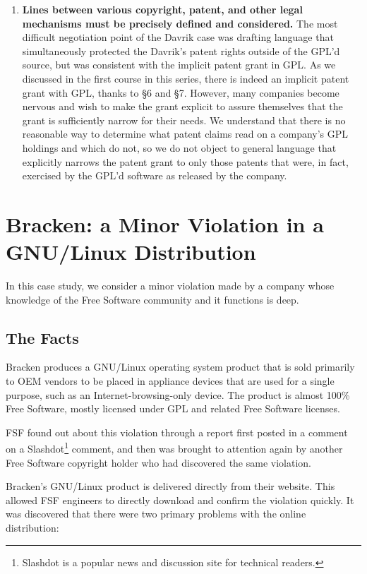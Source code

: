 \documentclass[12pt]{report}
\begin{document}
\begin{enumerate}
\item {\bf Lines between various copyright, patent, and other legal
  mechanisms must be precisely defined and considered.}  The most
  difficult negotiation point of the Davrik case was drafting language
  that simultaneously protected the Davrik's patent rights outside of the
  GPL'd source, but was consistent with the implicit patent grant in
  GPL\@.  As we discussed in the first course in this series, there is
  indeed an implicit patent grant with GPL, thanks to \S 6 and \S 7.
  However, many companies become nervous and wish to make the grant
  explicit to assure themselves that the grant is sufficiently narrow for
  their needs.  We understand that there is no reasonable way to determine
  what patent claims read on a company's GPL holdings and which do not, so
  we do not object to general language that explicitly narrows the patent
  grant to only those patents that were, in fact, exercised by the GPL'd
  software as released by the company.

\end{enumerate}

\chapter{Bracken: a Minor Violation in a GNU/Linux Distribution}

In this case study, we consider a minor violation made by a company whose
knowledge of the Free Software community and it functions is deep.

\section{The Facts} 

Bracken produces a GNU/Linux operating system product that is sold
primarily to OEM vendors to be placed in appliance devices that are used
for a single purpose, such as an Internet-browsing-only device.  The
product is almost 100\% Free Software, mostly licensed under GPL and
related Free Software licenses.

FSF found out about this violation through a report first posted in a
comment on a Slashdot\footnote{Slashdot is a popular news and discussion
  site for technical readers.} comment, and then was brought to attention
again by another Free Software copyright holder who had discovered the
same violation.

Bracken's GNU/Linux product is delivered directly from their website.
This allowed FSF engineers to directly download and confirm the violation
quickly.  It was discovered that there were two primary problems with the
online distribution:
\end{document}
